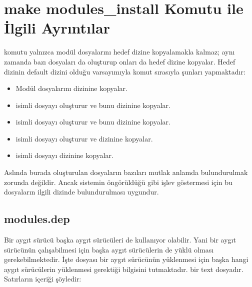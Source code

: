 \documentclass[a4paper,10pt,turkish]{sphinxmanual}
\begin{document}
\section{make modules\_install Komutu ile İlgili Ayrıntılar}
\label{\detokenize{kernelcompilation:make-modules-install-komutu-ile-ilgili-ayrintilar}}
\sphinxAtStartPar
{} komutu yalnızca modül dosyalarını hedef dizine kopyalamakla kalmaz; aynı
zamanda bazı dosyaları da oluşturup onları da hedef dizine kopyalar. Hedef dizinin default
 dizini olduğu varsayımıyla komut sırasıyla şunları yapmaktadır:
\begin{itemize}
\item {} 
\sphinxAtStartPar
Modül dosyalarını  dizinine kopyalar.

\item {} 
\sphinxAtStartPar
{} isimli dosyayı oluşturur ve bunu  dizinine
kopyalar.

\item {} 
\sphinxAtStartPar
{} isimli dosyayı oluşturur ve bunu  dizinine
kopyalar.

\item {} 
\sphinxAtStartPar
{} isimli dosyayı oluşturur ve  dizinine kopyalar.

\item {} 
\sphinxAtStartPar
{} isimli dosyayı  dizinine kopyalar.

\end{itemize}

\sphinxAtStartPar
Aslında burada oluşturulan dosyaların bazıları mutlak anlamda bulundurulmak zorunda değildir. Ancak
sistemin öngörüldüğü gibi işlev göstermesi için bu dosyaların ilgili dizinde bulundurulması uygundur.


\subsection{modules.dep}
\label{\detokenize{kernelcompilation:modules-dep}}
\sphinxAtStartPar
Bir aygıt sürücü başka aygıt sürücüleri de kullanıyor olabilir. Yani bir aygıt sürücünün
çalışabilmesi için başka aygıt sürücülerin de yüklü olması gerekebilmektedir. İşte 
dosyası bir aygıt sürücünün yüklenmesi için başka hangi aygıt sürücülerin yüklenmesi gerektiği
bilgisini tutmaktadır.  bir text dosyadır. Satırların içeriği şöyledir:
\end{document}
